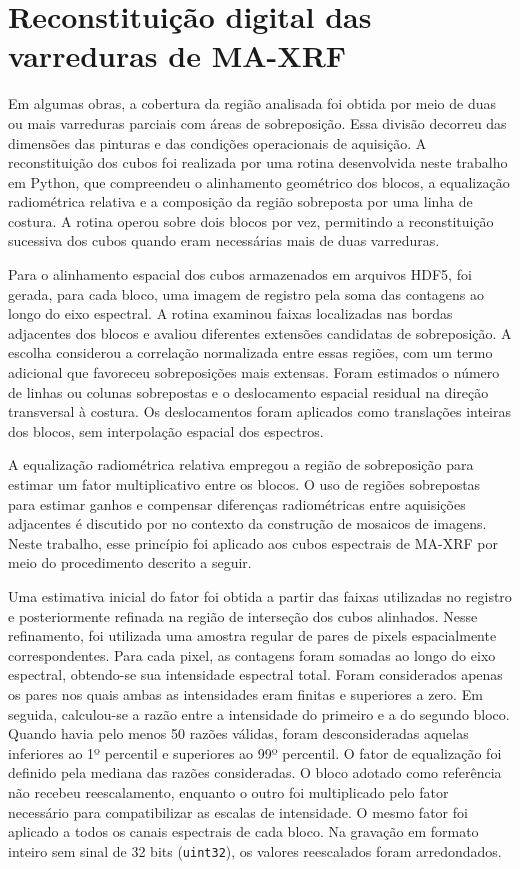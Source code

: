\section{Reconstituição digital das varreduras de MA-XRF}
\label{subsec:costura-hdf5}

Em algumas obras, a cobertura da região analisada foi obtida por meio de duas ou mais varreduras parciais com áreas de sobreposição. Essa divisão decorreu das dimensões das pinturas e das condições operacionais de aquisição. A reconstituição dos cubos foi realizada por uma rotina desenvolvida neste trabalho em Python, que compreendeu o alinhamento geométrico dos blocos, a equalização radiométrica relativa e a composição da região sobreposta por uma linha de costura. A rotina operou sobre dois blocos por vez, permitindo a reconstituição sucessiva dos cubos quando eram necessárias mais de duas varreduras.

Para o alinhamento espacial dos cubos armazenados em arquivos HDF5, foi gerada, para cada bloco, uma imagem de registro pela soma das contagens ao longo do eixo espectral. A rotina examinou faixas localizadas nas bordas adjacentes dos blocos e avaliou diferentes extensões candidatas de sobreposição. A escolha considerou a correlação normalizada entre essas regiões, com um termo adicional que favoreceu sobreposições mais extensas. Foram estimados o número de linhas ou colunas sobrepostas e o deslocamento espacial residual na direção transversal à costura. Os deslocamentos foram aplicados como translações inteiras dos blocos, sem interpolação espacial dos espectros.

A equalização radiométrica relativa empregou a região de sobreposição para estimar um fator multiplicativo entre os blocos. O uso de regiões sobrepostas para estimar ganhos e compensar diferenças radiométricas entre aquisições adjacentes é discutido por  no contexto da construção de mosaicos de imagens. Neste trabalho, esse princípio foi aplicado aos cubos espectrais de MA-XRF por meio do procedimento descrito a seguir.

Uma estimativa inicial do fator foi obtida a partir das faixas utilizadas no registro e posteriormente refinada na região de interseção dos cubos alinhados. Nesse refinamento, foi utilizada uma amostra regular de pares de pixels espacialmente correspondentes. Para cada pixel, as contagens foram somadas ao longo do eixo espectral, obtendo-se sua intensidade espectral total. Foram considerados apenas os pares nos quais ambas as intensidades eram finitas e superiores a zero. Em seguida, calculou-se a razão entre a intensidade do primeiro e a do segundo bloco. Quando havia pelo menos 50 razões válidas, foram desconsideradas aquelas inferiores ao 1º percentil e superiores ao 99º percentil. O fator de equalização foi definido pela mediana das razões consideradas. O bloco adotado como referência não recebeu reescalamento, enquanto o outro foi multiplicado pelo fator necessário para compatibilizar as escalas de intensidade. O mesmo fator foi aplicado a todos os canais espectrais de cada bloco. Na gravação em formato inteiro sem sinal de 32 bits (\texttt{uint32}), os valores reescalados foram arredondados.


